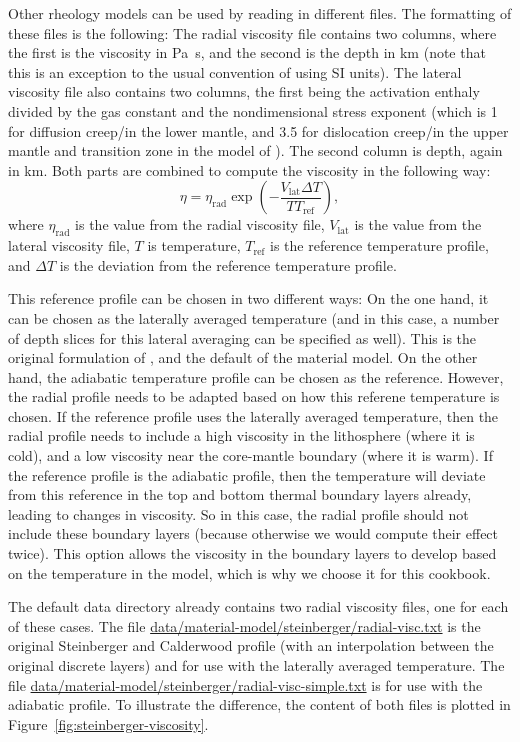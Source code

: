 Other rheology models can be used by reading in different files. The formatting of these files is the following: The radial viscosity file contains two columns, where the first is the viscosity in Pa~s, and the second is the depth in km (note that this is an exception to the usual \aspect{} convention of using SI units). The lateral viscosity file also contains two columns, the first being the activation enthaly divided by the gas constant and the nondimensional stress exponent (which is 1 for diffusion creep/in the lower mantle, and 3.5 for dislocation creep/in the upper mantle and transition zone in the model of \cite{stca06}). The second column is depth, again in km. 
Both parts are combined to compute the viscosity in the following way:
\begin{equation}
  \eta = \eta_\text{rad} \exp{ \left( -\frac{V_\text{lat} \Delta T}{T T_\text{ref}} \right)} , 
\end{equation}
where $\eta_\text{rad}$ is the value from the radial viscosity file, 
$V_\text{lat}$ is the value from the lateral viscosity file, 
$T$ is temperature, $T_\text{ref}$ is the reference temperature profile, 
and $\Delta T$ is the deviation from the reference temperature profile. 

This reference profile can be chosen in two different ways: On the one hand, it can be chosen as the laterally averaged temperature (and in this case, a number of depth slices for this lateral averaging can be specified as  well). This is the original formulation of \cite{stca06}, and the default of the material model. 
On the other hand, the adiabatic temperature profile can be chosen as the reference. 
However, the radial profile needs to be adapted based on how this referene temperature is chosen. 
If the reference profile uses the laterally averaged temperature, then the radial profile needs to include a high viscosity in the lithosphere (where it is cold), and a low viscosity near the core-mantle boundary (where it is warm). If the reference profile is the adiabatic profile, then the temperature will deviate from this reference in the top and bottom thermal boundary layers already, leading to changes in viscosity. So in this case, the radial profile should not include these boundary layers (because otherwise we would compute their effect twice). This option allows the viscosity in the boundary layers to develop based on the temperature in the model, which is why we choose it for this cookbook. 

The default data directory already contains two radial viscosity files, one for each of these cases. 
The file \url{data/material-model/steinberger/radial-visc.txt} is the original Steinberger and Calderwood \cite{stca06} profile (with an interpolation between the original discrete layers) and for use with the laterally averaged temperature. The file \url{data/material-model/steinberger/radial-visc-simple.txt} is for use with the adiabatic profile. To illustrate the difference, the content of both files is plotted in Figure~\ref{fig:steinberger-viscosity}. 

